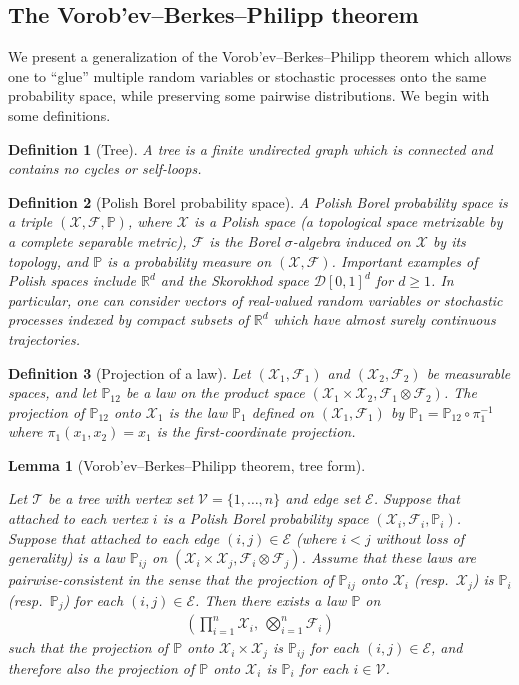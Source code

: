 \documentclass[11pt,lof]{puthesis}
\renewcommand{\P}{\ensuremath{\mathbb{P}}}
\newcommand{\R}{\ensuremath{\mathbb{R}}}
\newcommand{\cF}{\ensuremath{\mathcal{F}}}
\newcommand{\cX}{\ensuremath{\mathcal{X}}}
\newcommand{\cT}{\ensuremath{\mathcal{T}}}
\newcommand{\cV}{\ensuremath{\mathcal{V}}}
\newcommand{\cE}{\ensuremath{\mathcal{E}}}
\newcommand{\cD}{\ensuremath{\mathcal{D}}}
\theoremstyle{break}
\newtheorem{lemma}{Lemma}[section]
\newtheorem{definition}{Definition}[section]
\theoremstyle{proof}
\begin{document}
\subsection{The Vorob'ev--Berkes--Philipp theorem}

We present a generalization of the Vorob'ev--Berkes--Philipp theorem
\citep{dudley1999uniform}
which allows one to ``glue'' multiple random variables
or stochastic processes onto the same probability space,
while preserving some pairwise distributions.
We begin with some definitions.

\begin{definition}[Tree]
A \emph{tree} is a finite undirected graph which is connected and contains no
cycles or self-loops.
\end{definition}

\begin{definition}[Polish Borel probability space]
A \emph{Polish Borel probability space}
is a triple $(\cX, \cF, \P)$,
where $\cX$ is a Polish space
(a topological space metrizable by a complete separable metric),
$\cF$ is the Borel $\sigma$-algebra induced on $\cX$ by its topology,
and $\P$ is a probability measure on $(\cX, \cF)$.
Important examples of Polish spaces include $\R^d$ and
the Skorokhod space $\cD[0,1]^d$ for $d \geq 1$.
In particular,
one can consider vectors of real-valued random variables
or stochastic processes indexed by
compact subsets of $\R^d$ which have
almost surely continuous trajectories.
\end{definition}

\begin{definition}[Projection of a law]
Let $(\cX_1, \cF_1)$ and $(\cX_2, \cF_2)$
be measurable spaces, and
let $\P_{12}$ be a law on the
product space
$(\cX_1 \times \cX_2, \cF_1 \otimes \cF_2)$.
The \emph{projection} of $\P_{12}$
onto $\cX_1$ is the law
$\P_1$ defined on $(\cX_1, \cF_1)$
by $\P_1 = \P_{12} \circ \pi_1^{-1}$
where $\pi_1(x_1, x_2) = x_1$
is the first-coordinate projection.
\end{definition}

\begin{lemma}[Vorob'ev--Berkes--Philipp theorem, tree form]
\label{lem:kernel_app_vbp}

Let $\cT$ be a tree with vertex set $\cV = \{1, \ldots, n\}$
and edge set $\cE$.
Suppose that attached to each vertex $i$ is a
Polish Borel probability space
$(\cX_i, \cF_i, \P_i)$.
Suppose that attached to each edge $(i,j) \in \cE$
(where $i<j$ without loss of generality)
is a law $\P_{i j}$ on
$(\cX_i \times \cX_j, \cF_i \otimes \cF_j)$.
Assume that these laws are pairwise-consistent in the sense that
the projection of $\P_{i j}$ onto
$\cX_i$ (resp.\ $\cX_j$) is $\P_i$ (resp.\ $\P_j$)
for each $(i,j) \in \cE$.
Then there exists a law $\P$ on
%
\begin{align*}
\left(
\prod_{i=1}^n \cX_i, \
\bigotimes_{i=1}^n \cF_i
\right)
\end{align*}
%
such that the projection of $\P$
onto $\cX_i \times \cX_j$
is $\P_{i j}$ for each $(i,j) \in \cE$,
and therefore also the projection of $\P$
onto $\cX_i$ is $\P_i$ for each $i \in \cV$.

\end{lemma}
\end{document}
